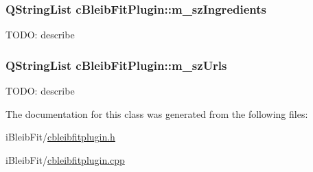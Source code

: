 \subsubsection[{\texorpdfstring{m\+\_\+sz\+Ingredients}{m_szIngredients}}]{\setlength{\rightskip}{0pt plus 5cm}Q\+String\+List c\+Bleib\+Fit\+Plugin\+::m\+\_\+sz\+Ingredients\hspace{0.3cm}{\ttfamily [private]}}\hypertarget{classc_bleib_fit_plugin_a255890766758afcab2c358bfb8695a15}{}\label{classc_bleib_fit_plugin_a255890766758afcab2c358bfb8695a15}
T\+O\+DO\+: describe 
\subsubsection[{\texorpdfstring{m\+\_\+sz\+Urls}{m_szUrls}}]{\setlength{\rightskip}{0pt plus 5cm}Q\+String\+List c\+Bleib\+Fit\+Plugin\+::m\+\_\+sz\+Urls\hspace{0.3cm}{\ttfamily [private]}}\hypertarget{classc_bleib_fit_plugin_ada1ca6d46ebd839f6f86bfee1ed0abb8}{}\label{classc_bleib_fit_plugin_ada1ca6d46ebd839f6f86bfee1ed0abb8}
T\+O\+DO\+: describe 

The documentation for this class was generated from the following files\+:\begin{DoxyCompactItemize}
\item 
i\+Bleib\+Fit/\hyperlink{cbleibfitplugin_8h}{cbleibfitplugin.\+h}\item 
i\+Bleib\+Fit/\hyperlink{cbleibfitplugin_8cpp}{cbleibfitplugin.\+cpp}\end{DoxyCompactItemize}
